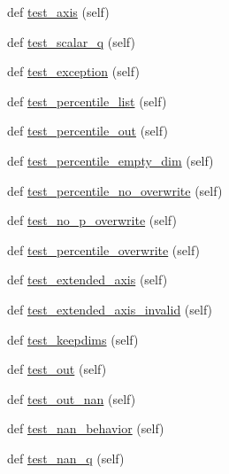 \begin{DoxyCompactItemize}
def \hyperlink{classnumpy_1_1lib_1_1tests_1_1test__function__base_1_1TestPercentile_a092f71fd4e292401e467a3570829499e}{test\+\_\+axis} (self)
\item 
def \hyperlink{classnumpy_1_1lib_1_1tests_1_1test__function__base_1_1TestPercentile_a23ebe8d02b72f1598f56ae79e5ef0dbc}{test\+\_\+scalar\+\_\+q} (self)
\item 
def \hyperlink{classnumpy_1_1lib_1_1tests_1_1test__function__base_1_1TestPercentile_a73b28525c7a49ca3d7c80a2db36809a3}{test\+\_\+exception} (self)
\item 
def \hyperlink{classnumpy_1_1lib_1_1tests_1_1test__function__base_1_1TestPercentile_ac9239a4ed15beff04b3b7005dba8a16e}{test\+\_\+percentile\+\_\+list} (self)
\item 
def \hyperlink{classnumpy_1_1lib_1_1tests_1_1test__function__base_1_1TestPercentile_a1054b8992b6f4d5fa34ae65cd039f38c}{test\+\_\+percentile\+\_\+out} (self)
\item 
def \hyperlink{classnumpy_1_1lib_1_1tests_1_1test__function__base_1_1TestPercentile_a475f6cad453c7ea7b84cf48fa8792e54}{test\+\_\+percentile\+\_\+empty\+\_\+dim} (self)
\item 
def \hyperlink{classnumpy_1_1lib_1_1tests_1_1test__function__base_1_1TestPercentile_a4b2e74d50cec3a22618e6e685c4a0a42}{test\+\_\+percentile\+\_\+no\+\_\+overwrite} (self)
\item 
def \hyperlink{classnumpy_1_1lib_1_1tests_1_1test__function__base_1_1TestPercentile_a7807fe5b798383359280e7e8fa80f089}{test\+\_\+no\+\_\+p\+\_\+overwrite} (self)
\item 
def \hyperlink{classnumpy_1_1lib_1_1tests_1_1test__function__base_1_1TestPercentile_ae1be763ab92d4e43b94e70d957d75f18}{test\+\_\+percentile\+\_\+overwrite} (self)
\item 
def \hyperlink{classnumpy_1_1lib_1_1tests_1_1test__function__base_1_1TestPercentile_afc4a2d202ded41c42d7b993111fabfa9}{test\+\_\+extended\+\_\+axis} (self)
\item 
def \hyperlink{classnumpy_1_1lib_1_1tests_1_1test__function__base_1_1TestPercentile_a51d9c8266ac148dbb7a0bfc9d78b86fe}{test\+\_\+extended\+\_\+axis\+\_\+invalid} (self)
\item 
def \hyperlink{classnumpy_1_1lib_1_1tests_1_1test__function__base_1_1TestPercentile_a0814d2de0884d73af85bbd79e78413f9}{test\+\_\+keepdims} (self)
\item 
def \hyperlink{classnumpy_1_1lib_1_1tests_1_1test__function__base_1_1TestPercentile_a4c0acef6e1f3e7d886f340832f6b6c0c}{test\+\_\+out} (self)
\item 
def \hyperlink{classnumpy_1_1lib_1_1tests_1_1test__function__base_1_1TestPercentile_adf008c8294e9dc7117126629566d6455}{test\+\_\+out\+\_\+nan} (self)
\item 
def \hyperlink{classnumpy_1_1lib_1_1tests_1_1test__function__base_1_1TestPercentile_a350cf97036e3952d4715da5fc79e0e9d}{test\+\_\+nan\+\_\+behavior} (self)
\item 
def \hyperlink{classnumpy_1_1lib_1_1tests_1_1test__function__base_1_1TestPercentile_a43f91f05726d12cae940b717fd495ac6}{test\+\_\+nan\+\_\+q} (self)
\end{DoxyCompactItemize}


